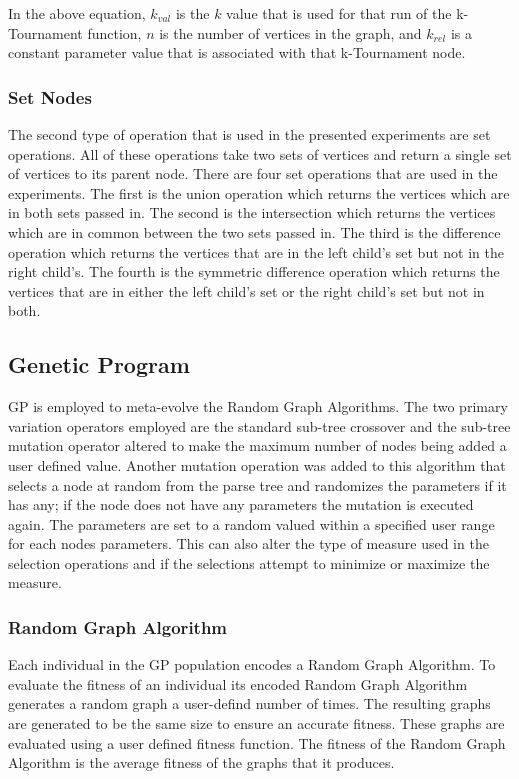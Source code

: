 \documentclass{article}
\begin{document}
In the above equation, $k_{val}$ is the $k$ value that is used for that run of the k-Tournament function, $n$ is the number of vertices in the graph, and $k_{rel}$
is a constant parameter value that is associated with that k-Tournament node.


\subsubsection{Set Nodes}

The second type of operation that is used in the presented experiments are set operations. All of these operations take two sets of vertices and return
a single set of vertices to its parent node. There are four set operations that are used in the experiments. The first is the union operation which returns
the vertices which are in both sets passed in. The second is the intersection which returns the vertices which are in common between the two sets passed in. 
The third is the difference operation which returns the vertices that are in the left child's set but not in the right child's. The fourth is the symmetric
difference operation which returns the vertices that are in either the left child's set or the right child's set but not in both. 


\subsection{Genetic Program}
GP is employed to meta-evolve the Random Graph Algorithms. The two primary variation operators employed are the standard sub-tree crossover and the sub-tree
mutation operator altered to make the maximum number of nodes being added a user defined value. Another mutation operation was added to this algorithm that 
selects a node at random from the parse tree and randomizes the parameters if it has any; if the node does not have any parameters the mutation is executed again. 
The parameters are set to a random valued within a specified user range for each nodes parameters. This can also alter the type of measure used in the selection
operations and if the selections attempt to minimize or maximize the measure. 

\subsubsection{Random Graph Algorithm}
Each individual in the GP population encodes a Random Graph Algorithm. To evaluate the fitness of an individual its encoded Random Graph Algorithm generates
a random graph a user-defind number of times. The resulting graphs are generated to be the same size to ensure an accurate fitness. These graphs are evaluated 
using a user defined fitness function. The fitness of the Random Graph Algorithm is the average fitness of the graphs that it produces. 
\end{document}
